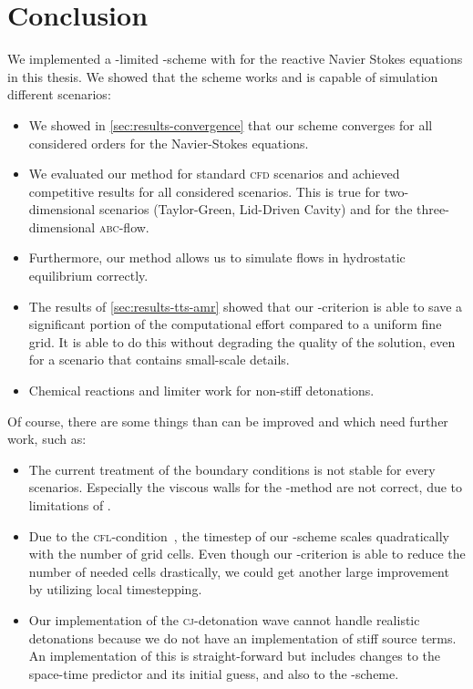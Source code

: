 \chapter{Conclusion}\label{chap:conclusion}
We implemented a \muscl{}-limited \aderdg{}-scheme with \amr{} for the reactive Navier Stokes equations in this thesis.
We showed that the scheme works and is capable of simulation different scenarios:
\begin{itemize}
\item We showed in \cref{sec:results-convergence} that our scheme converges for all considered orders for the Navier-Stokes equations.
\item We evaluated our method for standard \textsc{cfd} scenarios and achieved competitive results for all considered scenarios.
  This is true for two-dimensional scenarios (Taylor-Green, Lid-Driven Cavity) and for the three-dimensional \textsc{abc}-flow.
\item Furthermore, our method allows us to simulate flows in hydrostatic equilibrium correctly.
\item The results of \cref{sec:results-tts-amr} showed that our \amr{}-criterion is able to save a significant portion of the computational effort compared to a uniform fine grid.
  It is able to do this without degrading the quality of the solution, even for a scenario that contains small-scale details.
\item Chemical reactions and limiter work for non-stiff detonations.
\end{itemize}

Of course, there are some things than can be improved and which need further work, such as:
\begin{itemize}
\item The current treatment of the boundary conditions is not stable for every scenarios.
  Especially the viscous walls for the \muscl{}-method are not correct, due to limitations of \exahype{}.
\item Due to the \textsc{cfl}-condition~, the timestep of our \aderdg{}-scheme scales quadratically with the number of grid cells.
  Even though our \amr{}-criterion is able to reduce the number of needed cells drastically, we could get another large improvement by utilizing local timestepping.
\item Our implementation of the \textsc{cj}-detonation wave cannot handle realistic detonations because we do not have an implementation of stiff source terms.
  An implementation of this is straight-forward but includes changes to the space-time predictor and its initial guess, and also to the \muscl{}-scheme.
\end{itemize}

